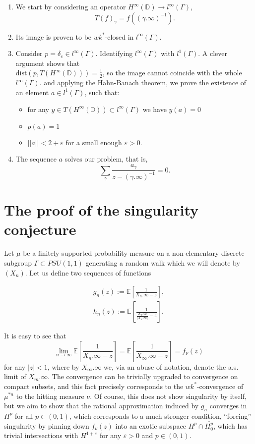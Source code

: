 \documentclass[11pt]{article}
\begin{document}
\begin{enumerate}
	\item We start by considering an operator $H^\infty(\mathbb{D}) \rightarrow l^\infty(\Gamma)$, 
	\[
	T(f)_\gamma = f((\gamma.\infty)^{-1}).
	\]
	\item Its image is proven to be $wk^*$-closed in $l^\infty(\Gamma)$.
	\item Consider $p = \delta_{e} \in l^\infty(\Gamma)$. Identifying $l^\infty(\Gamma)$ with $l^1(\Gamma)$. A clever argument shows that \\ $\text{dist}(p, T(H^\infty(\mathbb{D}))) = \frac{1}{2}$, so the image cannot coincide with the whole $l^\infty(\Gamma)$. and applying the Hahn-Banach theorem, we prove the existence of an element $a \in l^1(\Gamma)$, such that:
	\begin{itemize}
		\item for any $y \in T(H^\infty(\mathbb{D})) \subset l^\infty(\Gamma)$ we have $y(a) = 0$
		\item $p(a) = 1$
		\item $||a|| < 2 + \varepsilon$ for a small enough $\varepsilon > 0$.
	\end{itemize}
	\item The sequence $a$ solves our problem, that is,
	\[
	\sum_{\gamma} \dfrac{a_\gamma}{z - (\gamma.\infty)^{-1}} = 0.
	\]
\end{enumerate}

\section{The proof of the singularity conjecture}

Let $\mu$ be a finitely supported probability measure on a non-elementary discrete subgroup $\Gamma \subset PSU(1,1)$ generating a random walk which we will denote by $(X_n)$. Let us define two sequences of functions

\begin{gather}
	g_n(z) := \mathbb{E} \left[\frac{1}{X_n.\infty - z}\right], \\
	h_n(z) := \mathbb{E} \left[\frac{1}{\frac{X_n.\infty}{|X_n.\infty|} - z}\right].
\end{gather}

It is easy to see that
\[
\lim\limits_{n \rightarrow \infty} \mathbb{E} \left[\frac{1}{X_n.\infty - z}\right] = \mathbb{E} \left[\frac{1}{X_\infty.\infty - z}\right] = f_\nu(z)
\]
for any $|z| < 1$, where by $X_\infty.\infty$ we, via an abuse of notation, denote the a.s. limit of $X_m.\infty$. The convergence can be trivially upgraded to convergence on compact subsets, and this fact precisely corresponds to the $wk^*$-convergence of $\mu^{*n}$ to the hitting measure $\nu$. Of course, this does not show singularity by itself, but we aim to show that the rational approximation induced by $g_n$ converges in $H^p$ for all $p \in (0, 1)$, which corresponds to a much stronger condition, ``forcing'' singularity by pinning down $f_\nu(z)$ into an exotic subspace $H^p \cap \overline{H^p_0}$, which has trivial intersections with $H^{1 + \varepsilon}$ for any $\varepsilon > 0$ and $p \in (0,1)$. 
\end{document}
